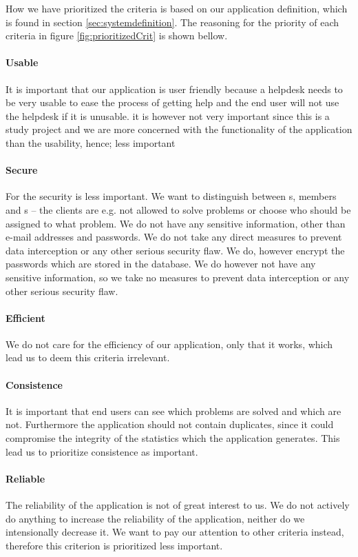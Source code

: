 How we have prioritized the criteria is based on our application definition, which is found in section \ref{sec:systemdefinition}. The reasoning for the priority of each criteria in figure \ref{fig:prioritizedCrit} is shown bellow.

\paragraph{Usable}

It is important that our application is user friendly because a helpdesk needs to be very usable to ease the process of getting help and the end user will not use the helpdesk if it is unusable.
it is however not very important since this is a study project and we are more concerned with the functionality of the application than the usability, hence; less important 
\paragraph{Secure}
For the \hdesk[] security is less important. We want to distinguish between \aclient[]s, \astaff[] members and \admin[]s -- the clients are e.g. not allowed to solve problems or choose who should be assigned to what problem.
We do not have any sensitive information, other than e-mail addresses and passwords. We do not take any direct measures to prevent data interception or any other serious security flaw. We do, however encrypt the passwords which are stored in the database.
We do however not have any sensitive information, so we take no measures to prevent data interception or any other serious security flaw.
\paragraph{Efficient}
We do not care for the efficiency of our application, only that it works, which lead us to deem this criteria irrelevant. 
\paragraph{Consistence}
It is important that end users can see which problems are solved and which are not.
Furthermore the application should not contain duplicates, since it could compromise the integrity of the statistics which the application generates.
This lead us to prioritize consistence as important.
\paragraph{Reliable}
The reliability of the \hdesk[] application is not of great interest to us.
We do not actively do anything to increase the reliability of the application, neither do we intensionally decrease it.
We want to pay our attention to other criteria instead, therefore this criterion is prioritized less important.
